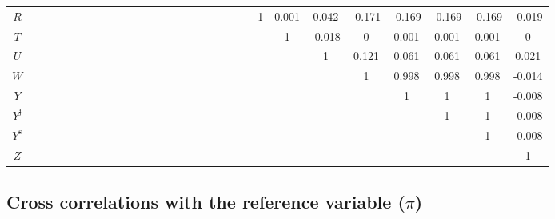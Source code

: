 \begin{tabular}{c|cccccccccccccccccccccccccccc|}
$R$ &  &  &  &  &  &  &  &  &  &  &  &  &  &  &  &  &  &  &  &  & 1 & 0.001 & 0.042 & -0.171 & -0.169 & -0.169 & -0.169 & -0.019 \\
$T$ &  &  &  &  &  &  &  &  &  &  &  &  &  &  &  &  &  &  &  &  &  & 1 & -0.018 & 0 & 0.001 & 0.001 & 0.001 & 0 \\
$U$ &  &  &  &  &  &  &  &  &  &  &  &  &  &  &  &  &  &  &  &  &  &  & 1 & 0.121 & 0.061 & 0.061 & 0.061 & 0.021 \\
$W$ &  &  &  &  &  &  &  &  &  &  &  &  &  &  &  &  &  &  &  &  &  &  &  & 1 & 0.998 & 0.998 & 0.998 & -0.014 \\
$Y$ &  &  &  &  &  &  &  &  &  &  &  &  &  &  &  &  &  &  &  &  &  &  &  &  & 1 & 1 & 1 & -0.008 \\
$Y^{\mathrm{j}}$ &  &  &  &  &  &  &  &  &  &  &  &  &  &  &  &  &  &  &  &  &  &  &  &  &  & 1 & 1 & -0.008 \\
$Y^{\mathrm{s}}$ &  &  &  &  &  &  &  &  &  &  &  &  &  &  &  &  &  &  &  &  &  &  &  &  &  &  & 1 & -0.008 \\
$Z$ &  &  &  &  &  &  &  &  &  &  &  &  &  &  &  &  &  &  &  &  &  &  &  &  &  &  &  & 1 \\
\hline
\end{tabular}


\subsection{Cross correlations with the reference variable ($\pi$)}

